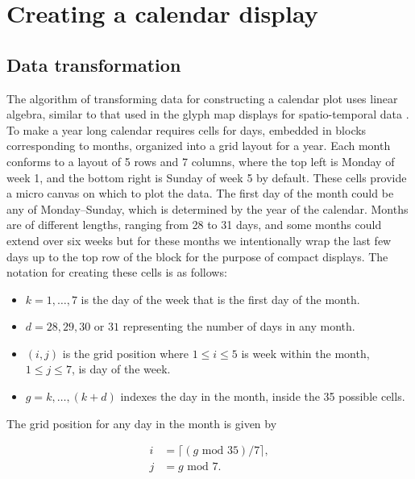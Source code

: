\documentclass[12pt]{article}
\providecommand{\tightlist}{%
  \setlength{\itemsep}{0pt}\setlength{\parskip}{0pt}}
\begin{document}
\hypertarget{sec:algorithm}{%
\section{Creating a calendar display}\label{sec:algorithm}}

\hypertarget{sec:transformation}{%
\subsection{Data transformation}\label{sec:transformation}}

The algorithm of transforming data for constructing a calendar plot uses linear algebra, similar to that used in the glyph map displays for spatio-temporal data \citep{Wickham2012glyph}. To make a year long calendar requires cells for days, embedded in blocks corresponding to months, organized into a grid layout for a year. Each month conforms to a layout of 5 rows and 7 columns, where the top left is Monday of week 1, and the bottom right is Sunday of week 5 by default. These cells provide a micro canvas on which to plot the data. The first day of the month could be any of Monday--Sunday, which is determined by the year of the calendar. Months are of different lengths, ranging from 28 to 31 days, and some months could extend over six weeks but for these months we intentionally wrap the last few days up to the top row of the block for the purpose of compact displays. The notation for creating these cells is as follows:

\begin{itemize}
\tightlist
\item
  \(k = 1, \dots , 7\) is the day of the week that is the first day of the month.
\item
  \(d = 28, 29, 30\) or \(31\) representing the number of days in any month.
\item
  \((i, j)\) is the grid position where \(1 \le i \le 5\) is week within the month, \(1 \le j \le 7\), is day of the week.
\item
  \(g = k, \dots,(k+d)\) indexes the day in the month, inside the 35 possible cells.
\end{itemize}

The grid position for any day in the month is given by

\begin{equation}
  \begin{aligned}
  i &= \lceil (g \text{ mod } 35) / 7\rceil, \\
  j &= g \text{ mod } 7.
  \end{aligned}
  \label{eq:grid}
\end{equation}
\end{document}
